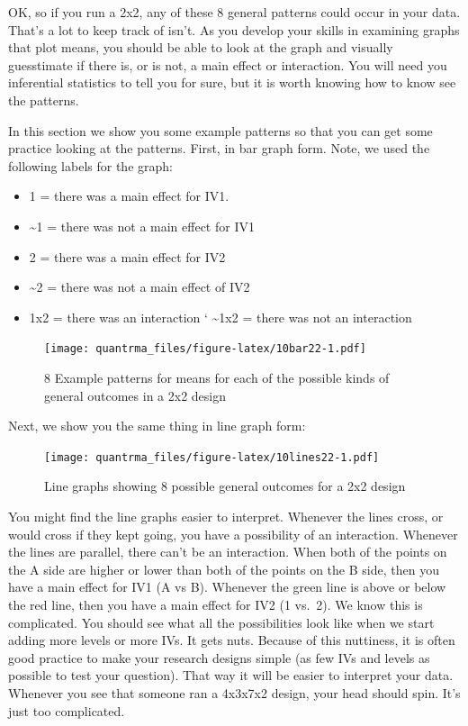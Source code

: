\documentclass[
]{book}
\providecommand{\tightlist}{%
  \setlength{\itemsep}{0pt}\setlength{\parskip}{0pt}}
\begin{document}
OK, so if you run a 2x2, any of these 8 general patterns could occur in your data. That's a lot to keep track of isn't. As you develop your skills in examining graphs that plot means, you should be able to look at the graph and visually guesstimate if there is, or is not, a main effect or interaction. You will need you inferential statistics to tell you for sure, but it is worth knowing how to know see the patterns.

In this section we show you some example patterns so that you can get some practice looking at the patterns. First, in bar graph form. Note, we used the following labels for the graph:

\begin{itemize}
\tightlist
\item
  1 = there was a main effect for IV1.
\item
  \textasciitilde1 = there was not a main effect for IV1
\item
  2 = there was a main effect for IV2
\item
  \textasciitilde2 = there was not a main effect of IV2
\item
  1x2 = there was an interaction
  ` \textasciitilde1x2 = there was not an interaction
\end{itemize}

\begin{figure}
\centering
\texttt{[image: quantrma\_files/figure-latex/10bar22-1.pdf]}
\caption{\label{fig:10bar22}8 Example patterns for means for each of the possible kinds of general outcomes in a 2x2 design}
\end{figure}

Next, we show you the same thing in line graph form:

\begin{figure}
\centering
\texttt{[image: quantrma\_files/figure-latex/10lines22-1.pdf]}
\caption{\label{fig:10lines22}Line graphs showing 8 possible general outcomes for a 2x2 design}
\end{figure}

You might find the line graphs easier to interpret. Whenever the lines cross, or would cross if they kept going, you have a possibility of an interaction. Whenever the lines are parallel, there can't be an interaction. When both of the points on the A side are higher or lower than both of the points on the B side, then you have a main effect for IV1 (A vs B). Whenever the green line is above or below the red line, then you have a main effect for IV2 (1 vs.~2). We know this is complicated. You should see what all the possibilities look like when we start adding more levels or more IVs. It gets nuts. Because of this nuttiness, it is often good practice to make your research designs simple (as few IVs and levels as possible to test your question). That way it will be easier to interpret your data. Whenever you see that someone ran a 4x3x7x2 design, your head should spin. It's just too complicated.
\end{document}
